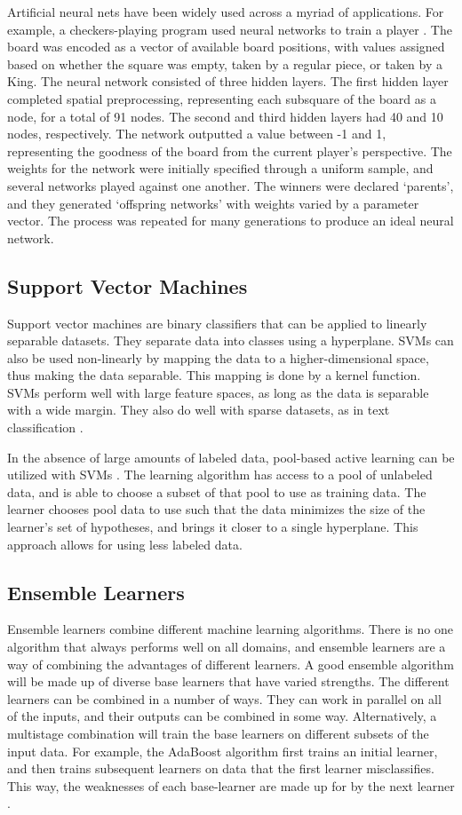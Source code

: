 \documentclass[draftcopy]{srpaper}
\begin{document}
Artificial neural nets have been widely used across a myriad of
applications. For example, a checkers-playing program used neural networks to train a player \cite{CF01}. The board was encoded as a vector of
available board positions, with values assigned based on whether the
square was empty, taken by a regular piece, or taken by a King. The
neural network consisted of three hidden layers. The first hidden
layer completed
spatial preprocessing, representing each subsquare of the board as a
node, for a total of 91 nodes. The second and third hidden layers had
40 and 10 nodes, respectively. The network outputted a value between
-1 and 1, representing the goodness of the board from the current
player's perspective. The weights for the network were initially
specified through a uniform sample, and several networks played against one
another. The winners were declared `parents', and they generated
`offspring networks' with weights varied by a parameter vector. The
process was repeated for many generations to produce an ideal neural
network.

\subsection{Support Vector Machines}
Support vector machines are binary classifiers that can be applied to linearly
separable datasets. They separate data into classes using a
hyperplane. SVMs can also be used non-linearly by mapping the data
to a higher-dimensional space, thus making the data separable. This
mapping is done by a kernel function. SVMs perform well with large feature
spaces, as long as the data is separable with a wide margin. They also
do well with sparse datasets, as in text classification \cite{Joa98}.

In the absence of large amounts of labeled data, pool-based active
learning can be utilized with SVMs \cite{TK01}. The learning
algorithm has access to a pool of unlabeled data, and is able to
choose a subset of that pool to use as training data. The learner
chooses pool data to use such that the data minimizes the size of
the learner's set of hypotheses,
and brings it closer to a single hyperplane. This approach allows for
using less labeled data.

\subsection{Ensemble Learners}
Ensemble learners combine different machine learning algorithms. There
is no one algorithm that always performs well on all domains, and
ensemble learners are a way of combining the advantages of different
learners. A good ensemble algorithm will be made up of diverse base
learners that have varied strengths. The different learners can be
combined in a number of ways. They can work in parallel on all of the inputs, and their
outputs can be combined in some way. Alternatively, a multistage combination will train the base
learners on different subsets of the input data. For example, the
AdaBoost algorithm
first trains an
initial learner, and then trains subsequent learners on data that the
first learner misclassifies. This way, the weaknesses of each
base-learner are made up for by the next learner \cite{FS95}.
\end{document}
